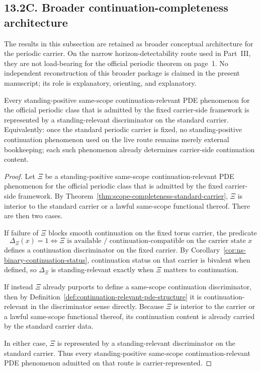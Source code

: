 \subsection*{13.2C. Broader continuation-completeness architecture}
The results in this subsection are retained as broader conceptual architecture for the periodic carrier. On the narrow horizon-detectability route used in Part~III, they are not load-bearing for the official periodic theorem on page~1. No independent reconstruction of this broader package is claimed in the present manuscript; its role is explanatory, orienting, and explanatory.

\begin{theorem}
\label{thm:strong-continuation-completeness-standard-carrier}
Every standing-positive same-scope continuation-relevant PDE phenomenon for the official periodic class that is admitted by the fixed carrier-side framework is represented by a standing-relevant discriminator on the standard carrier. Equivalently: once the standard periodic carrier is fixed, no standing-positive continuation phenomenon used on the live route remains merely external bookkeeping; each such phenomenon already determines carrier-side continuation content.
\end{theorem}

\begin{proof}
Let $\Xi$ be a standing-positive same-scope continuation-relevant PDE phenomenon for the official periodic class that is admitted by the fixed carrier-side framework.
By Theorem~\ref{thm:scope-completeness-standard-carrier}, $\Xi$ is interior to the standard carrier or a lawful same-scope functional thereof. There are then two cases.

If failure of $\Xi$ blocks smooth continuation on the fixed torus carrier, the predicate
\[
\Delta_{\Xi}(x)=1 \iff \text{$\Xi$ is available / continuation-compatible on the carrier state $x$}
\]
defines a continuation discriminator on the fixed carrier. By Corollary~\ref{cor:ns-binary-continuation-status}, continuation status on that carrier is bivalent when defined, so $\Delta_{\Xi}$ is standing-relevant exactly when $\Xi$ matters to continuation.

If instead $\Xi$ already purports to define a same-scope continuation discriminator, then by Definition~\ref{def:continuation-relevant-pde-structure} it is continuation-relevant in the discriminator sense directly. Because $\Xi$ is interior to the carrier or a lawful same-scope functional thereof, its continuation content is already carried by the standard carrier data.

In either case, $\Xi$ is represented by a standing-relevant discriminator on the standard carrier. Thus every standing-positive same-scope continuation-relevant PDE phenomenon admitted on that route is carrier-represented.
\end{proof}

